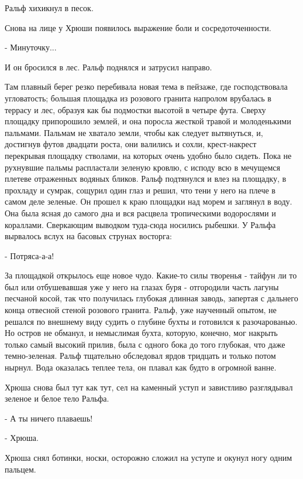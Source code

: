 \documentclass[12pt]{article}
\begin{document}
    Ральф хихикнул в песок.

    Снова на лице у Хрюши появилось выражение боли и сосредоточенности.

    - Минуточку...

    И он бросился в лес. Ральф поднялся и затрусил направо.

    Там   плавный   берег  резко  перебивала  новая  тема  в  пейзаже,  где
господствовала угловатость; большая площадка из  розового  гранита  напролом
врубалась  в  террасу и лес, образуя как бы подмостки высотой в четыре фута.
Сверху  площадку  припорошило  землей,  и  она  поросла  жесткой  травой   и
молоденькими   пальмами.   Пальмам  не  хватало  земли,  чтобы  как  следует
вытянуться, и,  достигнув  футов  двадцати  роста,  они  валились  и  сохли,
крест-накрест  перекрывая  площадку  стволами,  на которых очень удобно было
сидеть. Пока не рухнувшие пальмы распластали зеленую кровлю, с исподу всю  в
мечущемся  плетеве  отраженных  водяных  бликов.  Ральф подтянулся и влез на
площадку, в прохладу и сумрак, сощурил один глаз и решил, что тени у него на
плече в самом деле зеленые. Он прошел к краю площадки над морем и заглянул в
воду. Она была ясная до самого дна и вся расцвела тропическими водорослями и
кораллами.  Сверкающим  выводком  туда-сюда  носились  рыбешки.   У   Ральфа
вырвалось вслух на басовых струнах восторга:

    - Потряса-а-а!

    За  площадкой открылось еще новое чудо. Какие-то силы творенья - тайфун
ли то был или отбушевавшая уже у него на  глазах  буря  -  отгородили  часть
лагуны  песчаной косой, так что получилась глубокая длинная заводь, запертая
с дальнего конца отвесной стеной  розового  гранита.  Ральф,  уже  наученный
опытом,  не  решался  по  внешнему виду судить о глубине бухты и готовился к
разочарованью. Но остров не обманул, и немыслимая бухта,  которую,  конечно,
мог  накрыть  только  самый  высокий  прилив,  была  с  одного  бока до того
глубокая, что даже темно-зеленая. Ральф тщательно обследовал ярдов  тридцать
и  только  потом  нырнул.  Вода оказалась теплее тела, он плавал как будто в
огромной ванне.

    Хрюша снова был тут  как  тут,  сел  на  каменный  уступ  и  завистливо
разглядывал зеленое и белое тело Ральфа.

    - А ты ничего плаваешь!

    - Хрюша.

    Хрюша  снял  ботинки,  носки,  осторожно сложил на уступе и окунул ногу
одним пальцем.
\end{document}

